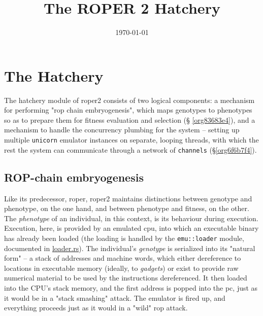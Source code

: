 \documentclass[11pt]{article}
\date{\today}
\title{The ROPER 2 Hatchery}
\begin{document}
\maketitle
\tableofcontents


\section{The Hatchery}
\label{sec:orgc34bf46}

The hatchery module of \gls{roper2} consists of two logical components: a
mechanism for performing "\gls{rop} chain embryogenesis", which maps genotypes to
phenotypes so as to prepare them for fitness evaluation and selection (\S
\ref{org83683e4}), and a mechanism to handle the concurrency plumbing for the
system -- setting up multiple \texttt{unicorn} emulator instances on separate, looping
threads, with which the rest the system can communicate through a network of
\texttt{channels} (\S \ref{org6f6b7f4}). 

\subsection{ROP-chain embryogenesis}
\label{sec:orge1bec7e}
\label{org83683e4}

Like its predecessor, \gls{roper}, \gls{roper2} maintains distinctions between
genotype and phenotype, on the one hand, and between phenotype and fitness,
on the other. The \emph{phenotype} of an individual, in this context, is its
behaviour during execution. Execution, here, is provided by an emulated
\gls{cpu}, into which an executable binary has already been loaded (the
loading is handled by the \texttt{emu::loader} module, documented in \url{loader.rs}).
The individual's \emph{genotype} is serialized into its "natural form" -- a
stack of addresses and machine words, which either dereference to locations
in executable memory (ideally, to \emph{gadgets}) or exist to provide raw numerical
material to be used by the instructions dereferenced. It then loaded into
the CPU's stack memory, and the first address is popped into the \gls{pc}, 
just as it would be in a "stack smashing" attack. The emulator is fired up,
and everything proceeds just as it would in a "wild" \gls{rop} attack.  
\end{document}
